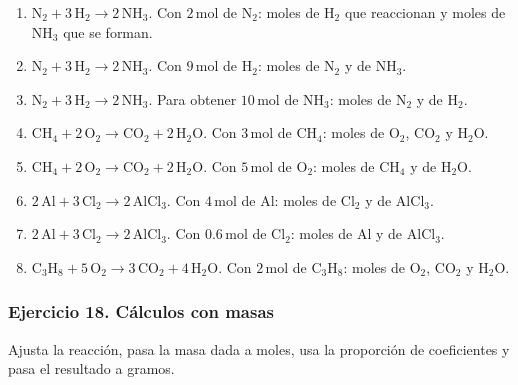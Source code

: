 \begin{enumerate}
    \item[a)] $\mathrm{N_2}+3\,\mathrm{H_2}\rightarrow2\,\mathrm{NH_3}$.
    Con $2\,\mathrm{mol}$ de $\mathrm{N_2}$:
    moles de $\mathrm{H_2}$ que reaccionan y moles de $\mathrm{NH_3}$
    que se forman.

    \item[b)] $\mathrm{N_2}+3\,\mathrm{H_2}\rightarrow2\,\mathrm{NH_3}$.
    Con $9\,\mathrm{mol}$ de $\mathrm{H_2}$:
    moles de $\mathrm{N_2}$ y de $\mathrm{NH_3}$.

    \item[c)] $\mathrm{N_2}+3\,\mathrm{H_2}\rightarrow2\,\mathrm{NH_3}$.
    Para obtener $10\,\mathrm{mol}$ de $\mathrm{NH_3}$:
    moles de $\mathrm{N_2}$ y de $\mathrm{H_2}$.

    \item[d)] $\mathrm{CH_4}+2\,\mathrm{O_2}\rightarrow
    \mathrm{CO_2}+2\,\mathrm{H_2O}$.
    Con $3\,\mathrm{mol}$ de $\mathrm{CH_4}$:
    moles de $\mathrm{O_2}$, $\mathrm{CO_2}$ y $\mathrm{H_2O}$.

    \item[e)] $\mathrm{CH_4}+2\,\mathrm{O_2}\rightarrow
    \mathrm{CO_2}+2\,\mathrm{H_2O}$.
    Con $5\,\mathrm{mol}$ de $\mathrm{O_2}$:
    moles de $\mathrm{CH_4}$ y de $\mathrm{H_2O}$.

    \item[f)] $2\,\mathrm{Al}+3\,\mathrm{Cl_2}\rightarrow2\,\mathrm{AlCl_3}$.
    Con $4\,\mathrm{mol}$ de Al:
    moles de $\mathrm{Cl_2}$ y de $\mathrm{AlCl_3}$.

    \item[g)] $2\,\mathrm{Al}+3\,\mathrm{Cl_2}\rightarrow2\,\mathrm{AlCl_3}$.
    Con $0.6\,\mathrm{mol}$ de $\mathrm{Cl_2}$:
    moles de Al y de $\mathrm{AlCl_3}$.

    \item[h)] $\mathrm{C_3H_8}+5\,\mathrm{O_2}\rightarrow
    3\,\mathrm{CO_2}+4\,\mathrm{H_2O}$.
    Con $2\,\mathrm{mol}$ de $\mathrm{C_3H_8}$:
    moles de $\mathrm{O_2}$, $\mathrm{CO_2}$ y $\mathrm{H_2O}$.
\end{enumerate}

\subsubsection*{Ejercicio 18. Cálculos con masas}

Ajusta la reacción, pasa la masa dada a moles,
usa la proporción de coeficientes y pasa el resultado a gramos.

